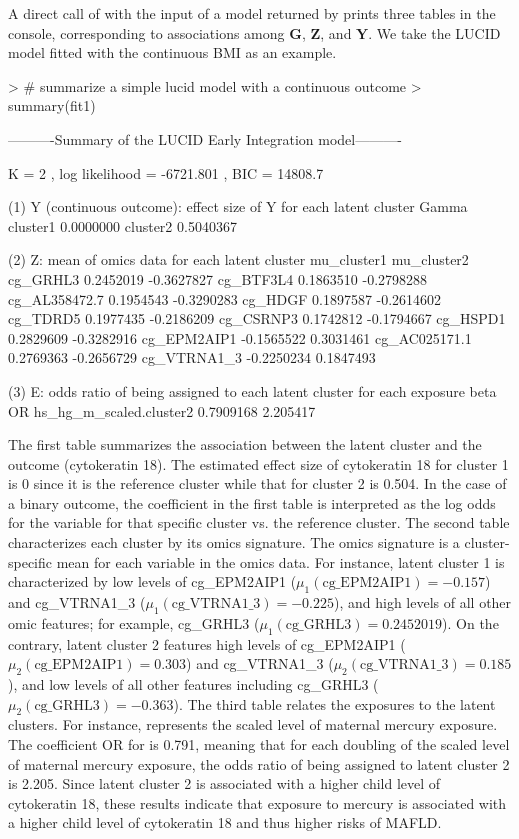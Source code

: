 A direct call of  with the input of a model returned by  prints three tables in the console, corresponding to associations among $\bm G$, $\bm Z$, and $\bm Y$. We take the LUCID model fitted with the continuous BMI as an example.

\begin{example}
> # summarize a simple lucid model with a continuous outcome
> summary(fit1)

----------Summary of the LUCID Early Integration model---------- 

K =  2 , log likelihood = -6721.801 , BIC =  14808.7 

(1) Y (continuous outcome): effect size of Y for each latent cluster
             Gamma
cluster1 0.0000000
cluster2 0.5040367

(2) Z: mean of omics data for each latent cluster 
              mu_cluster1 mu_cluster2
cg_GRHL3        0.2452019  -0.3627827
cg_BTF3L4       0.1863510  -0.2798288
cg_AL358472.7   0.1954543  -0.3290283
cg_HDGF         0.1897587  -0.2614602
cg_TDRD5        0.1977435  -0.2186209
cg_CSRNP3       0.1742812  -0.1794667
cg_HSPD1        0.2829609  -0.3282916
cg_EPM2AIP1    -0.1565522   0.3031461
cg_AC025171.1   0.2769363  -0.2656729
cg_VTRNA1_3    -0.2250234   0.1847493

(3) E: odds ratio of being assigned to each latent cluster for each exposure 
                             beta       OR
hs_hg_m_scaled.cluster2 0.7909168 2.205417
\end{example}

The first table summarizes the association between the latent cluster and the outcome (cytokeratin 18). The estimated effect size of cytokeratin 18 for cluster 1 is 0 since it is the reference cluster while that for cluster 2 is 0.504. In the case of a binary outcome, the coefficient in the first table is interpreted as the log odds for the variable for that specific cluster vs. the reference cluster. The second table characterizes each cluster by its omics signature. The omics signature is a cluster-specific mean for each variable in the omics data. For instance, latent cluster 1 is characterized by low levels of cg\_EPM2AIP1 ($\mu_1 (\text{cg\_EPM2AIP1})= -0.157$) and cg\_VTRNA1\_3 ($\mu_1 (\text{cg\_VTRNA1\_3})= -0.225$), and high levels of all other omic features; for example, cg\_GRHL3 ($\mu_1 (\text{cg{\_}GRHL3})= 0.2452019$). On the contrary, latent cluster 2 features high levels of cg{\_}EPM2AIP1 ($\mu_2 (\text{cg{\_}EPM2AIP1})=  0.303$) and cg{\_}VTRNA1{\_}3 ($\mu_2 (\text{cg{\_}VTRNA1{\_}3})= 0.185$), and low levels of all other features including cg{\_}GRHL3 ($\mu_2 (\text{cg{\_}GRHL3})= -0.363$). The third table relates the exposures to the latent clusters. For instance,  represents the scaled level of maternal mercury exposure. The coefficient OR for  is 0.791, meaning that for each doubling of the scaled level of maternal mercury exposure, the odds ratio of being assigned to latent cluster 2 is 2.205. Since latent cluster 2 is associated with a higher child level of cytokeratin 18, these results indicate that exposure to mercury is associated with a higher child level of cytokeratin 18 and thus higher risks of MAFLD.

